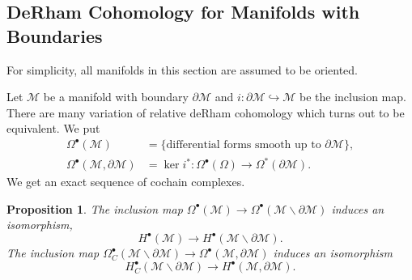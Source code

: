 \documentclass[10pt]{article}
\newtheorem{proposition}{Proposition}[section]
\newcommand{\M}[0]{\mathcal{M}}
\begin{document}
\subsection{DeRham Cohomology for Manifolds with Boundaries}
For simplicity, all manifolds in this section are assumed to be oriented. 
\par Let $\M$ be a manifold with boundary $\partial\M$ and $i:\partial\M\hookrightarrow\M$ be the inclusion map. There are many variation of relative deRham cohomology which turns out to be equivalent. We put 
\begin{align*}
  \Omega^\bullet(\M)&=\{\text{differential forms smooth up to $\partial\M$}\},\\
  \Omega^\bullet(\M,\partial\M)&=\ker i^*:\Omega^\bullet(\Omega)\to\Omega^*(\partial \M).
\end{align*}
We get an exact sequence of cochain complexes.
\begin{center}
\end{center}
\begin{proposition}
  The inclusion map $\Omega^\bullet(\M)\to\Omega^\bullet(\M\backslash\partial\M)$ induces an isomorphism,
  \begin{equation*}
    H^\bullet(\M)\to H^\bullet(\M\backslash\partial\M).
  \end{equation*}
  The inclusion map $\Omega^\bullet_C(\M\backslash\partial\M)\to\Omega^\bullet(\M,\partial\M)$ induces an isomorphism 
  \begin{equation*}
    H^\bullet_C(\M\backslash\partial\M)\to H^\bullet(\M,\partial\M).
  \end{equation*}
\end{proposition}
\end{document}
